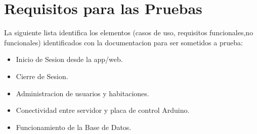 \section{Requisitos para las Pruebas}
La siguiente lista identifica los elementos (casos de uso, requisitos funcionales,no funcionales)
identificados con la documentacion para ser sometidos a prueba:
	\begin{itemize}
		\item Inicio de Sesion desde la app/web.
		\item Cierre de Sesion.
		\item Administracion de usuarios y habitaciones.
		\item Conectividad entre servidor y placa de control Arduino.
		\item Funcionamiento de la Base de Datos.
	\end{itemize}
\newpage

